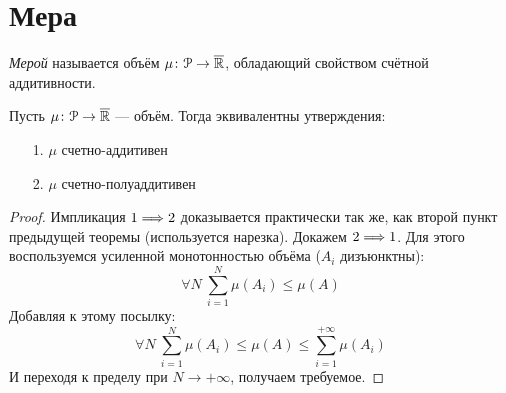 \section{Мера}

\begin{definition}
    \textit{Мерой} называется объём $\mu \colon \mathcal{P} \to \overline{\mathbb{R}}$, обладающий свойством
    счётной аддитивности.
\end{definition}

\begin{theorem}
    Пусть $\mu \colon \mathcal{P} \to \overline{\mathbb{R}}$ --- объём. Тогда эквивалентны утверждения:
    \begin{itemize}
        \item[1.] $\mu$ счетно-аддитивен
        \item[2.] $\mu$ счетно-полуаддитивен
    \end{itemize}
\end{theorem}
\begin{proof}
	Импликация $1 \Longrightarrow 2$ доказывается практически так же, как второй
	пункт предыдущей теоремы (используется нарезка). Докажем $2 \Longrightarrow 1$.
	Для этого воспользуемся усиленной монотонностью объёма ($A_i$ дизъюнктны):
\[
	\forall N~ \sum_{i = 1}^{N}{\mu(A_i)} \leqslant \mu(A)
\]
	Добавляя к этому посылку:
\[
	\forall N~ \sum_{i = 1}^{N}{\mu(A_i)} \leqslant \mu(A) \leqslant
	\sum_{i = 1}^{+\infty}{\mu(A_i)}
\]
	И переходя к пределу при $N \to +\infty$, получаем требуемое.
\end{proof}

